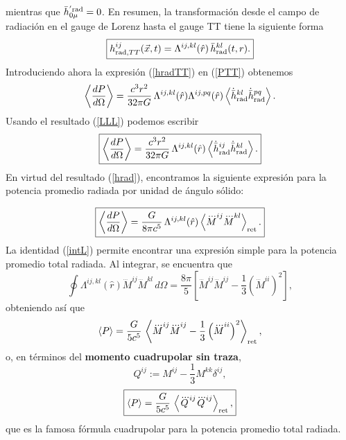 mientras que $\bar{h}^{'\rm rad}_{0\mu}=0$. En resumen, la transformación desde el campo de radiación en el gauge de Lorenz hasta el gauge TT tiene la siguiente forma
\begin{equation}\label{hradTT}
\boxed{h_{{\rm rad}, TT}^{ij}(\vec{x},t)= \Lambda^{ij,kl}(\hat{r})\,\bar{h}_{\rm rad}^{kl}(t,r).}
\end{equation}
Introduciendo ahora la expresión (\ref{hradTT})  en  (\ref{PTT}) obtenemos
\begin{equation}\label{PGL}
\left\langle\frac{d P}{d\Omega}\right\rangle=\frac{c^3r^2}{32\pi G}\, \Lambda^{ij,kl}(\hat{r})\Lambda^{ij,pq}(\hat{r})\left\langle\dot{\bar{h}}_{\rm rad}^{kl}\dot{\bar{h}}_{\rm rad}^{pq}\right\rangle.
\end{equation}
Usando el resultado (\ref{LLL}) podemos escribir
\begin{equation}\label{PGL2}
\boxed{\left\langle\frac{d P}{d\Omega}\right\rangle=\frac{c^3r^2}{32\pi G}\, \Lambda^{ij,kl}(\hat{r})\left\langle\dot{\bar{h}}_{\rm rad}^{ij}\dot{\bar{h}}_{\rm rad}^{kl}
\right\rangle.}
\end{equation}
En virtud del resultado (\ref{hrad}), encontramos la siguiente expresión para la potencia promedio radiada por unidad de ángulo sólido:

\begin{equation}\label{PGL3}
\boxed{\left\langle\frac{d P}{d\Omega}\right\rangle=\frac{G}{8\pi c^5}\, \Lambda^{ij,kl}(\hat{r})\left\langle\dddot{M}^{ij}\dddot{M}^{kl}\right\rangle_{\rm ret} .}
\end{equation}
La identidad (\ref{intL}) permite encontrar una expresión simple para la potencia promedio total radiada. Al integrar, se encuentra que
\begin{equation}\label{intLII}
\oint\Lambda^{ij,kl}(\hat{r})\dddot{M}^{ij}
\dddot{M}^{kl}\,d\Omega=\frac{8\pi}{5}\left[\dddot{M}^{ij}\dddot{M}^{ij}-\frac{1}{3}(\dddot{M}^{ii})^2\right],
\end{equation}
obteniendo así que
\begin{equation}\label{PII}
\left\langle P\right\rangle =\frac{G}{5c^5}\, \left\langle \dddot{M}^{ij}\dddot{M}^{ij}-\frac{1}{3}\left(\dddot{M}^{ii}\right)^2\right\rangle_{\rm ret},
\end{equation}
o, en términos del \textbf{momento cuadrupolar sin traza},
\begin{equation}\label{Qij}
Q^{ij}:=M^{ij}-\frac{1}{3}M^{kk}\delta^{ij},
\end{equation}
\begin{equation}\label{PTTQ}
\boxed{\left\langle P\right\rangle=\frac{G}{5c^5}\, \left\langle \dddot{Q}^{ij}\dddot{Q}^{ij}\right\rangle_{\rm ret} ,}
\end{equation}
que es la famosa fórmula cuadrupolar para la potencia promedio total radiada.

